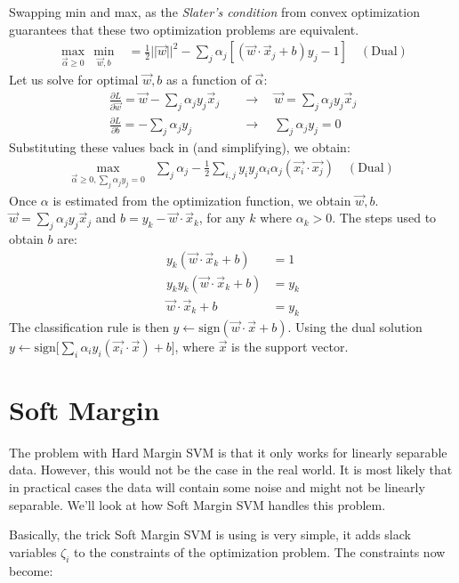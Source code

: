 \documentclass{article}
\begin{document}
Swapping min and max, as the \emph{Slater's condition} from convex optimization guarantees that these two optimization problems are equivalent.
\begin{align*}
\max_{\vec{\alpha}\geq0} \, \min_{\vec{w},b} &= \frac{1}{2}||\vec{w}||^2 - \sum_j \alpha_j [(\vec{w} \cdot \vec{x}_j + b)y_j - 1] \quad \mathrm{(Dual)}
\end{align*}
Let us solve for optimal $\vec{w}, b$ as a function of $\vec{\alpha}$: 
\begin{align*}
\frac{\partial L}{\partial \vec{w}} = \vec{w} - \sum_j \alpha_j y_j \vec{x}_j \quad & \rightarrow \quad \vec{w} = \sum_j \alpha_j y_j \vec{x}_j \\
\frac{\partial L}{\partial b} = - \sum_j \alpha_j y_j \quad & \rightarrow \quad \sum_j \alpha_j y_j = 0
\end{align*}
Substituting these values back in (and simplifying), we obtain: 
\begin{align*}
\max_{\vec{\alpha}\geq0, \sum_j \alpha_j y_j = 0} & \sum_j \alpha_j - \frac{1}{2} \sum_{i,j} y_iy_j\alpha_i\alpha_j (\vec{x_i}\cdot \vec{x_j}) \quad \mathrm{(Dual)}
\end{align*}
Once $\alpha$ is estimated from the optimization function, we obtain $\vec{w}, b$.
$\vec{w} = \sum_j \alpha_j y_j \vec{x}_j$ and $b = y_k - \vec{w}\cdot \vec{x}_k$, for any $k$ where $\alpha_k > 0$.
The steps used to obtain $b$ are:
\begin{align*}
y_k (\vec{w}\cdot \vec{x}_k + b) &= 1 \\
y_ky_k (\vec{w}\cdot \vec{x}_k + b) &= y_k \\
\vec{w}\cdot \vec{x}_k + b &= y_k
\end{align*}
The classification rule is then $y \leftarrow \mathrm{sign} (\vec{w}\cdot\vec{x}+b)$. Using the dual solution $y \leftarrow \mathrm{sign} \big[\sum_i\alpha_iy_i(\vec{x_i}\cdot \vec{x})+b\big]$, where $\vec{x}$ is the support vector.

\section{Soft Margin}
The problem with Hard Margin SVM is that it only works for linearly separable data. However, this would not be the case in the real world. It is most likely that in practical cases the data will contain some noise and might not be linearly separable. We'll look at how Soft Margin SVM handles this problem.

Basically, the trick Soft Margin SVM is using is very simple, it adds slack variables $\zeta_i$ to the constraints of the optimization problem. The constraints now become:
\end{document}

